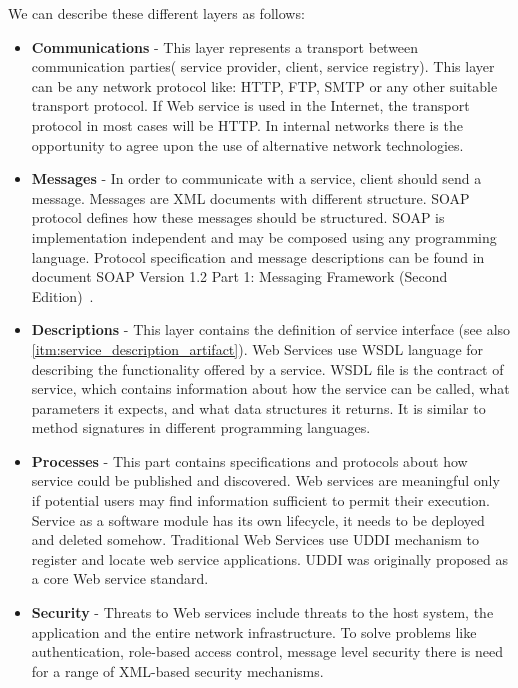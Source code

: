 We can describe these different layers as follows:
\begin{itemize}
  \item \textbf{Communications} - This layer represents a transport between
  communication parties( service provider, client, service registry). This layer
  can be any network protocol like: HTTP, FTP, SMTP or any
  other suitable transport protocol. If Web service is used in the Internet, the
  transport protocol in most cases will be HTTP. In internal networks there is the opportunity to agree upon the use of alternative
network technologies.

\item \textbf{Messages} - In order to communicate with a service, client should
send a message. Messages are XML documents with different structure.
SOAP protocol defines how these messages should be structured.
SOAP is implementation independent and may be composed using any
programming language. Protocol specification and message descriptions can be
found in document SOAP Version 1.2 Part 1: Messaging Framework (Second
Edition)~\cite{soap_protocol_spec}.

\item \textbf{Descriptions} - This layer contains the definition of service
interface (see also \autoref{itm:service_description_artifact}). Web Services
use WSDL language for describing the functionality offered by a service.
WSDL file is the contract of service, which contains information about how
the service can be called, what parameters it expects, and what data structures it returns.
It is similar to method signatures in different programming languages.

\item \textbf{Processes} - This part contains specifications and protocols
about how service could be published and discovered. Web services are meaningful
only if potential users may find information sufficient to permit their execution.
Service as a software module has its own lifecycle, it needs to be deployed and deleted somehow.
Traditional Web Services use UDDI  mechanism to register and locate web
service applications. UDDI was originally proposed as a core Web service
standard.

\item \textbf{Security} - Threats to Web services include threats to the host
system, the application and the entire network infrastructure. To solve problems
like authentication, role-based access control, message level security there is
need for a range of XML-based security mechanisms.


\end{itemize}
